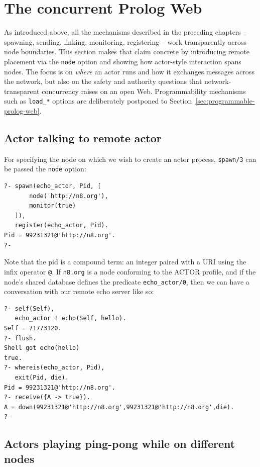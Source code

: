\section{The concurrent Prolog Web}\label{sec:concurrent-prolog-web}

As introduced above, all the mechanisms described in the preceding
chapters -- spawning, sending, linking, monitoring, registering --
work transparently across node boundaries. This section makes that
claim concrete by introducing remote placement via the \texttt{node}
option and showing how actor-style interaction spans nodes. The focus
is on \emph{where} an actor runs and how it exchanges messages across
the network, but also on the safety and authority questions that
network-transparent concurrency raises on an open Web.
Programmability mechanisms such as \texttt{load\_*} options are deliberately postponed to
Section~\ref{sec:programmable-prolog-web}.



\subsection{Actor talking to remote actor}\label{sec:talking-to-remote-actor}

For specifying the node on which we wish to create an actor process, \texttt{spawn/3} can be passed the \texttt{node} option: 

\begin{verbatim}
?- spawn(echo_actor, Pid, [
       node('http://n8.org'),
       monitor(true)
   ]),
   register(echo_actor, Pid).
Pid = 99231321@'http://n8.org'.
?- 
\end{verbatim}

\noindent Note that the pid is a compound term: an integer paired with a URI using the infix operator \texttt{@}. If \texttt{n8.org} is a node conforming to the ACTOR profile, and if the node's shared database defines the predicate \texttt{echo\_actor/0}, then we can have a conversation with our remote echo server like so:

\begin{verbatim}
?- self(Self),
   echo_actor ! echo(Self, hello).
Self = 71773120.
?- flush.
Shell got echo(hello)
true.
?- whereis(echo_actor, Pid),
   exit(Pid, die).
Pid = 99231321@'http://n8.org'.
?- receive({A -> true}).
A = down(99231321@'http://n8.org',99231321@'http://n8.org',die).
?- 
\end{verbatim}


\subsection{Actors playing ping-pong while on different nodes}\label{sec:pong-pong-two-nodes}


